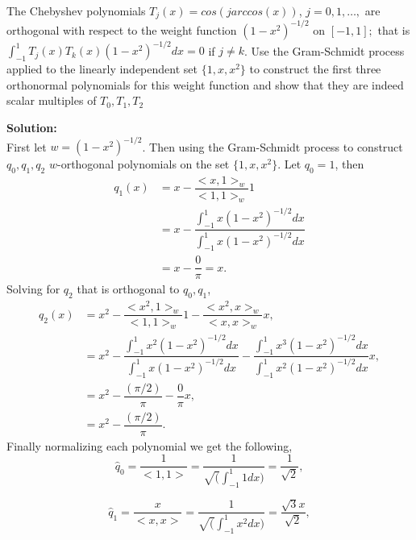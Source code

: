 \documentclass[12pt]{article}
\makeatletter
\theoremstyle{homework}
\newenvironment{exercise}[1]
{\def\@currentlabel{#1}\exercisecore}
{\endexercisecore}
\newcommand{\localhead}[1]{\par\smallskip\noindent\textbf{#1}\nobreak\\}%
\newcommand\solution{\localhead{Solution:}}
\makeatother
\begin{document}
\begin{exercise}{Problem 10.5} The Chebyshev polynomials $T_j(x)  = cos(j arccos(x))$, $j = 0,1,\dots,$ are orthogonal with respect to the
    weight function $(1 - x^2)^{-1/2}$ on $[-1,1];$ that is $\int_{-1}^{1} T_j(x)T_k(x)(1 - x^2)^{-1/2} dx = 0$ if $j \neq k$. Use the Gram-Schmidt
    process applied to the linearly independent set $\{1, x, x^2\}$ to construct the first three orthonormal polynomials for this weight function
    and show that they are indeed scalar multiples of $T_0, T_1, T_2$\\

    \solution First let $w =(1 - x^2)^{-1/2}$. Then using the Gram-Schmidt process to construct $q_0, q_1, q_2$ $w$-orthogonal polynomials on the set $\{1, x, x^2\}$.
    Let $q_0 = 1$, then 
    \begin{align*}
        q_1(x) &= x - \dfrac{<x,1>_w}{<1,1>_w} 1\\
        &= x - \dfrac{\int_{-1}^{1} x(1 - x^2)^{-1/2}dx}{\int_{-1}^{1} x(1 - x^2)^{-1/2}dx}\\
        &= x - \dfrac{0}{\pi} = x.
    \end{align*}
    Solving for $q_2$ that is orthogonal to $q_0, q_1$,
    \begin{align*}
        q_2(x) &= x^2 - \dfrac{<x^2,1>_w}{<1,1>_w} 1 - \dfrac{<x^2,x>_w}{<x,x>_w} x,\\
        &= x^2 - \dfrac{\int_{-1}^{1} x^2(1 - x^2)^{-1/2}dx}{\int_{-1}^{1} x(1 - x^2)^{-1/2}dx} - \dfrac{\int_{-1}^{1} x^3(1 - x^2)^{-1/2}dx}{\int_{-1}^{1} x^2(1 - x^2)^{-1/2}dx}x,\\
        &= x^2 - \dfrac{(\pi/2)}{\pi} - \dfrac{0}{\pi}x,\\
        &= x^2 - \dfrac{(\pi/2)}{\pi}.
    \end{align*}
    Finally normalizing each polynomial we get the following,
    \begin{equation*}
        \hat{q}_0 = \dfrac{1}{<1,1>} = \dfrac{1}{\sqrt(\int_{-1}^{1}1 dx)} = \dfrac{1}{\sqrt{2}},
    \end{equation*}
    
    \begin{equation*}
        \hat{q}_1 = \dfrac{x}{<x,x>} = \dfrac{1}{\sqrt(\int_{-1}^{1} x^2 dx)} = \dfrac{\sqrt{3}x}{\sqrt{2}},
    \end{equation*}
    

\end{exercise}
\end{document}
